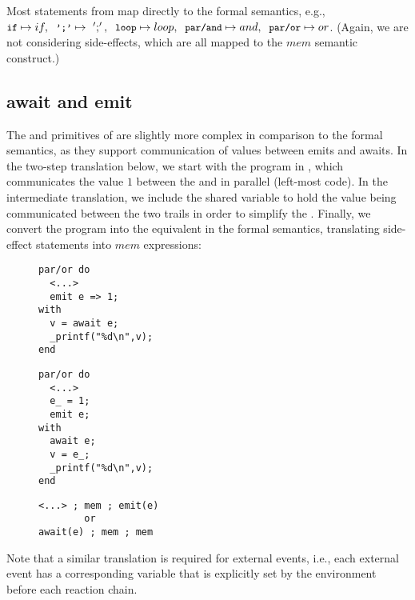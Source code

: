 Most statements from \CEU map directly to the formal semantics, e.g.,
$
    {\small{\texttt{if}}}      \mapsto if   ,\;\;
    {\small{\texttt{';'}}}     \mapsto ~';' ,\;\;
    {\small{\texttt{loop}}}    \mapsto loop ,\;\;
    {\small{\texttt{par/and}}} \mapsto and  ,\;\;
    {\small{\texttt{par/or}}}  \mapsto or
$.
(Again, we are not considering side-effects, which are all mapped to the $mem$ 
semantic construct.)

\subsection{await and emit}

The  and  primitives of \CEU are slightly more complex 
in comparison to the formal semantics, as they support communication of values 
between emits and awaits.
In the two-step translation below, we start with the program in \CEU, which 
communicates the value $1$ between the  and  in parallel 
(left-most code).
In the intermediate translation, we include the shared variable  to 
hold the value being communicated between the two trails in order to simplify 
the .
Finally, we convert the program into the equivalent in the formal semantics, 
translating side-effect statements into $mem$ expressions:

\begin{figure}[h!]
\begin{minipage}[t]{0.32\linewidth}
\begin{lstlisting}
par/or do
  <...>
  emit e => 1;
with
  v = await e;
  _printf("%d\n",v);
end
\end{lstlisting}
\end{minipage}
%
\begin{minipage}[t]{0.32\linewidth}
\begin{lstlisting}
par/or do
  <...>
  e_ = 1;
  emit e;
with
  await e;
  v = e_;
  _printf("%d\n",v);
end
\end{lstlisting}
\end{minipage}
%
\begin{minipage}[t]{0.34\linewidth}
\begin{lstlisting}
<...> ; mem ; emit(e)
        or
await(e) ; mem ; mem
\end{lstlisting}
\end{minipage}
\end{figure}

Note that a similar translation is required for external events, i.e., each 
external event has a corresponding variable that is explicitly set by the 
environment before each reaction chain.

